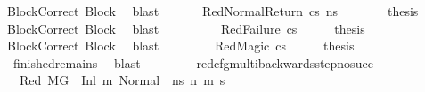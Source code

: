 \begin{isabellebody}
\ BlockCorrect\ Block\ \isamarkupfalse%
\ blast\isanewline
\ \ \isamarkupfalse%
\isanewline
\ \ \isamarkupfalse%
\ {\isacharparenleft}{\kern0pt}RedNormalReturn\ cs\ ns{\isacharprime}{\kern0pt}{\isacharparenright}{\kern0pt}\isanewline
\ \ \ \ \isamarkupfalse%
\ \isamarkupfalse%
\ {\isacharquery}{\kern0pt}thesis\ \isamarkupfalse%
\ BlockCorrect\ Block\ \isamarkupfalse%
\ blast\ \isanewline
\ \ \isamarkupfalse%
\isanewline
\ \ \ \ \isamarkupfalse%
\ {\isacharparenleft}{\kern0pt}RedFailure\ cs{\isacharparenright}{\kern0pt}\isanewline
\ \ \isamarkupfalse%
\ \isamarkupfalse%
\ {\isacharquery}{\kern0pt}thesis\ \isamarkupfalse%
\ BlockCorrect\ Block\ \isamarkupfalse%
\ blast\isanewline
\ \ \isamarkupfalse%
\isanewline
\ \ \ \ \isamarkupfalse%
\ {\isacharparenleft}{\kern0pt}RedMagic\ cs{\isacharparenright}{\kern0pt}\isanewline
\ \ \isamarkupfalse%
\ \isamarkupfalse%
\ {\isacharquery}{\kern0pt}thesis\ \isamarkupfalse%
\ {}\ finished{\isacharunderscore}{\kern0pt}remains\ \isamarkupfalse%
\ blast\ \isanewline
\ \ \isamarkupfalse%
\isanewline
{}\isamarkupfalse%
%
\endisatagproof
{\isafoldproof}%
%
\isadelimproof
\isanewline
%
\endisadelimproof
\ \ \ \isanewline
{}\isamarkupfalse%
\ red{\isacharunderscore}{\kern0pt}cfg{\isacharunderscore}{\kern0pt}multi{\isacharunderscore}{\kern0pt}backwards{\isacharunderscore}{\kern0pt}step{\isacharunderscore}{\kern0pt}no{\isacharunderscore}{\kern0pt}succ{\isacharcolon}{\kern0pt}\isanewline
\ \ \isanewline
\ \ \ Red{\isacharcolon}{\kern0pt}\ {\isachardoublequoteopen}M{\isacharcomma}{\kern0pt}{\isasymLambda}{\isacharcomma}{\kern0pt}{\isasymGamma}{\isacharcomma}{\kern0pt}{\isasymOmega}{\isacharcomma}{\kern0pt}G\ {\isasymturnstile}\ {\isacharparenleft}{\kern0pt}Inl\ m{\isacharcomma}{\kern0pt}\ {\isacharparenleft}{\kern0pt}Normal\ \ n{\isacharunderscore}{\kern0pt}s{\isacharparenright}{\kern0pt}{\isacharparenright}{\kern0pt}\ {\isacharminus}{\kern0pt}n{\isasymrightarrow}{\isacharasterisk}{\kern0pt}\ {\isacharparenleft}{\kern0pt}m{\isacharprime}{\kern0pt}{\isacharcomma}{\kern0pt}\ s{\isacharprime}{\kern0pt}{\isacharparenright}{\kern0pt}{\isachardoublequoteclose}\ \isanewline

\end{isabellebody}
